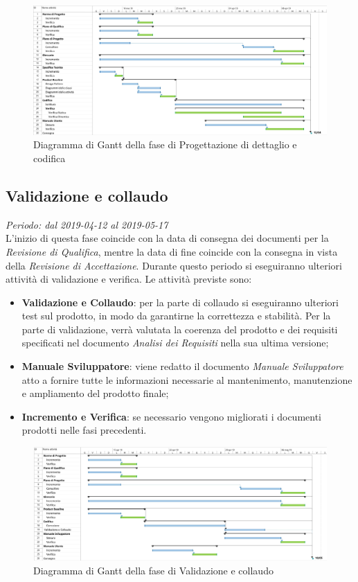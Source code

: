 \begin{figure}[H]
	\includegraphics[width=0.99\linewidth]{res/images/gantt_pd.jpg}
	\caption{Diagramma di Gantt della fase di Progettazione di dettaglio e codifica}
\end{figure}
\pagebreak


\subsection{Validazione e collaudo}
\textit{Periodo: dal 2019-04-12 al 2019-05-17 } \\
L'inizio di questa fase coincide con la data di consegna dei documenti per la 
\textit{Revisione di Qualifica}, mentre la data di fine coincide con la 
consegna in vista della \textit{Revisione di Accettazione}. Durante questo periodo 
si eseguiranno ulteriori attività di validazione e verifica. Le attività 
previste sono: 
\begin{itemize}
	\item \textbf{Validazione e Collaudo}: per la parte di collaudo si 
	eseguiranno ulteriori test sul prodotto, in modo da garantirne la 
	correttezza e stabilità. Per la parte di validazione, verrà 
	valutata la coerenza del prodotto e dei requisiti specificati nel documento 
	\textit{Analisi dei Requisiti} nella sua ultima versione;
	\item \textbf{Manuale Sviluppatore}: viene redatto il documento \textit{Manuale Sviluppatore} atto a fornire tutte le informazioni necessarie al mantenimento, manutenzione e ampliamento del prodotto finale;
	\item \textbf{Incremento e Verifica}: se necessario vengono migliorati i 
	documenti prodotti nelle fasi precedenti.
\end{itemize}
\begin{figure}[H]
	\includegraphics[width=0.99\linewidth]{res/images/gantt_val.jpg}
	\caption{Diagramma di Gantt della fase di Validazione e collaudo}
\end{figure}